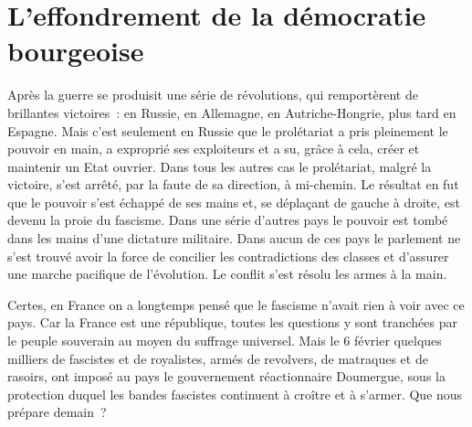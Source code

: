 \documentclass[french,twoside]{book} %
\begin{document}
\section[{L’effondrement de la démocratie bourgeoise}]{L’effondrement de la démocratie bourgeoise}
\noindent Après la guerre se produisit une série de révolutions, qui remportèrent de brillantes victoires : en Russie, en Allemagne, en Autriche-Hongrie, plus tard en Espagne. Mais c’est seulement en Russie que le prolétariat a pris pleinement le pouvoir en main, a exproprié ses exploiteurs et a su, grâce à cela, créer et maintenir un Etat ouvrier. Dans tous les autres cas le prolétariat, malgré la victoire, s’est arrêté, par la faute de sa direction, à mi-chemin. Le résultat en fut que le pouvoir s’est échappé de ses mains et, se déplaçant de gauche à droite, est devenu la proie du fascisme. Dans une série d’autres pays le pouvoir est tombé dans les mains d’une dictature militaire. Dans aucun de ces pays le parlement ne s’est trouvé avoir la force de concilier les contradictions des classes et d’assurer  une marche pacifique de l’évolution. Le conflit s’est résolu les armes à la main.\par
Certes, en France on a longtemps pensé que le fascisme n’avait rien à voir avec ce pays. Car la France est une république, toutes les questions y sont tranchées par le peuple souverain au moyen du suffrage universel. Mais le 6 février quelques milliers de fascistes et de royalistes, armés de revolvers, de matraques et de rasoirs, ont imposé au pays le gouvernement réactionnaire Doumergue, sous la protection duquel les bandes fascistes continuent à croître et à s’armer. Que nous prépare demain ?\par
\end{document}
